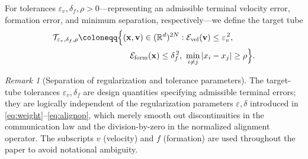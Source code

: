 \documentclass[pdflatex,sn-mathphys-num]{sn-jnl}%
\numberwithin{equation}{section}
\theoremstyle{thmstyleone}%
\theoremstyle{remark}
\newtheorem{remark}{Remark}
\theoremstyle{definition}
\newcommand{\R}{\mathbb{R}}
\newcommand{\calT}{\mathcal{T}}
\newcommand{\calE}{\mathcal{E}}
\begin{document}
For tolerances $\varepsilon_v,\delta_f,\rho>0$---representing an admissible
terminal velocity error, formation error, and minimum separation,
respectively---we define the target tube
\begin{equation}\label{eq:target}
\begin{aligned}
  \calT_{\varepsilon_v,\delta_f,\rho}
  \coloneqq \Bigl\{ &(\mathbf{x},\mathbf{v})\in(\R^d)^{2N} :
    \calE_{\mathrm{vel}}(\mathbf{v})\le\varepsilon_v^{\,2}, \\
  &\,\,\,\,\,\calE_{\mathrm{form}}(\mathbf{x})\le\delta_f^{\,2},\
    \min_{i\neq j}|x_i-x_j|\ge\rho \Bigr\}.
\end{aligned}
\end{equation}

\begin{remark}[Separation of regularization and tolerance parameters]
\label{rem:eps-delta-disambiguation}
The target-tube tolerances $\varepsilon_v,\delta_f$ are design
quantities specifying admissible terminal errors; they are logically
independent of the regularization parameters $\varepsilon,\delta$ introduced
in \eqref{eq:weight}--\eqref{eq:alignop}, which merely smooth out
discontinuities in the communication law and the division-by-zero in the
normalized alignment operator. The subscripts $v$ (velocity) and $f$
(formation) are used throughout the paper to avoid notational ambiguity.
\end{remark}
\end{document}

